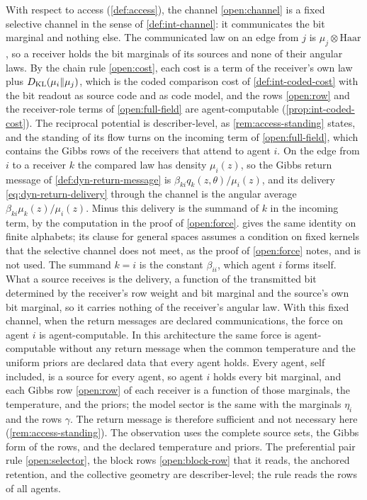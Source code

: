 With respect to access (\cref{def:access}), the channel \cref{open:channel} is a fixed selective channel in the sense of \cref{def:int-channel}: it communicates the bit marginal and nothing else. The communicated law on an edge from $j$ is $\mu_j\otimes\mathrm{Haar}$, so a receiver holds the bit marginals of its sources and none of their angular laws. By the chain rule \cref{open:cost}, each cost is a term of the receiver's own law plus $D_{\mathrm{KL}}(\mu_i\Vert\mu_j)$, which is the coded comparison cost of \cref{def:int-coded-cost} with the bit readout as source code and as code model, and the rows \cref{open:row} and the receiver-role terms of \cref{open:full-field} are agent-computable (\cref{prop:int-coded-cost}). The reciprocal potential is describer-level, as \cref{rem:access-standing} states, and the standing of its flow turns on the incoming term of \cref{open:full-field}, which contains the Gibbs rows of the receivers that attend to agent $i$. On the edge from $i$ to a receiver $k$ the compared law has density $\mu_i(z)$, so the Gibbs return message of \cref{def:dyn-return-message} is $\beta_{ki}q_k(z,\theta)/\mu_i(z)$, and its delivery \cref{eq:dyn-return-delivery} through the channel is the angular average $\beta_{ki}\mu_k(z)/\mu_i(z)$. Minus this delivery is the summand of $k$ in the incoming term, by the computation in the proof of \cref{open:force}.  gives the same identity on finite alphabets; its clause for general spaces assumes a condition on fixed kernels that the selective channel does not meet, as the proof of \cref{open:force} notes, and is not used. The summand $k=i$ is the constant $\beta_{ii}$, which agent $i$ forms itself. What a source receives is the delivery, a function of the transmitted bit determined by the receiver's row weight and bit marginal and the source's own bit marginal, so it carries nothing of the receiver's angular law. With this fixed channel, when the return messages are declared communications, the force on agent $i$ is agent-computable. In this architecture the same force is agent-computable without any return message when the common temperature and the uniform priors are declared data that every agent holds. Every agent, self included, is a source for every agent, so agent $i$ holds every bit marginal, and each Gibbs row \cref{open:row} of each receiver is a function of those marginals, the temperature, and the priors; the model sector is the same with the marginals $\eta_i$ and the rows $\gamma$. The return message is therefore sufficient and not necessary here (\cref{rem:access-standing}). The observation uses the complete source sets, the Gibbs form of the rows, and the declared temperature and priors. The preferential pair rule \cref{open:selector}, the block rows \cref{open:block-row} that it reads, the anchored retention, and the collective geometry are describer-level; the rule reads the rows of all agents.

